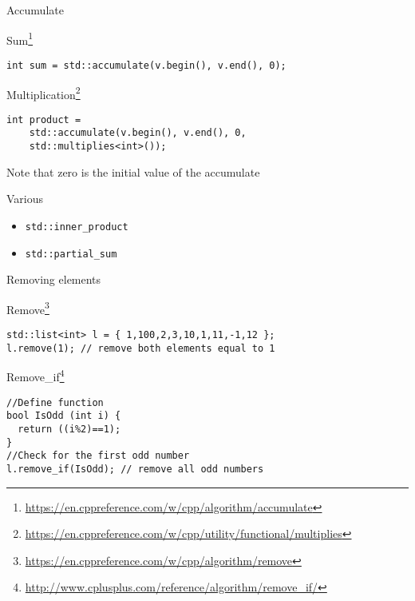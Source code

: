 \documentclass[12pt,t]{beamer}
\begin{document}
\begin{frame}[fragile]{Accumulate}

\begin{block}{Sum\footnote{\tiny\url{https://en.cppreference.com/w/cpp/algorithm/accumulate}}}
\vspace{-0.25cm}
\begin{lstlisting}
int sum = std::accumulate(v.begin(), v.end(), 0);
\end{lstlisting}
\end{block}
\vspace{-0.25cm}
\begin{block}{Multiplication\footnote{\tiny\url{https://en.cppreference.com/w/cpp/utility/functional/multiplies}}}
\begin{lstlisting}
int product = 
	std::accumulate(v.begin(), v.end(), 0, 
	std::multiplies<int>());
\end{lstlisting}
\end{block}
Note that zero is the initial value of the accumulate

\begin{block}{Various}
\begin{itemize}
\item \lstinline|std::inner_product| 
\item \lstinline|std::partial_sum|
\end{itemize}
\end{block}

\end{frame}

\begin{frame}[fragile]{Removing elements}

\begin{block}{Remove\footnote{\tiny\url{https://en.cppreference.com/w/cpp/algorithm/remove}}}
\begin{lstlisting}
std::list<int> l = { 1,100,2,3,10,1,11,-1,12 };
l.remove(1); // remove both elements equal to 1
\end{lstlisting}
\end{block}
\vspace{-0.25cm}
\begin{block}{Remove\_if\footnote{\tiny\url{http://www.cplusplus.com/reference/algorithm/remove_if/}}}
\begin{lstlisting}
//Define function
bool IsOdd (int i) {
  return ((i%2)==1);
}
//Check for the first odd number
l.remove_if(IsOdd); // remove all odd numbers
\end{lstlisting}
\end{block}


\end{frame}
\end{document}
